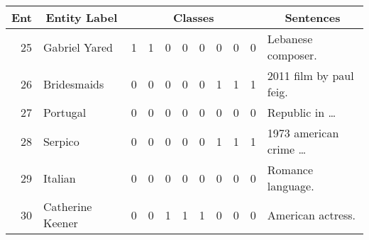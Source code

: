 \begin{tabular}{| r | l | r | r | r | r | r | r | r | r | l |}
    \hline
    
    \multicolumn{1}{|c|}{\textbf{Ent}} &
    \multicolumn{1}{|c|}{\textbf{Entity Label}} &
    \multicolumn{8}{|c|}{\textbf{Classes}} &
    \multicolumn{1}{|c|}{\textbf{Sentences}} \\
    
    \hline \hline

    25 & Gabriel Yared    & 1 & 1 & 0 & 0 & 0 & 0 & 0 & 0 & Lebanese composer.        \\
    26 & Bridesmaids      & 0 & 0 & 0 & 0 & 0 & 1 & 1 & 1 & 2011 film by paul feig.   \\
    27 & Portugal         & 0 & 0 & 0 & 0 & 0 & 0 & 0 & 0 & Republic in \dots         \\
    28 & Serpico          & 0 & 0 & 0 & 0 & 0 & 1 & 1 & 1 & 1973 american crime \dots \\
    29 & Italian          & 0 & 0 & 0 & 0 & 0 & 0 & 0 & 0 & Romance language.         \\
    30 & Catherine Keener & 0 & 0 & 1 & 1 & 1 & 0 & 0 & 0 & American actress.         \\
    
    \hline
\end{tabular}
